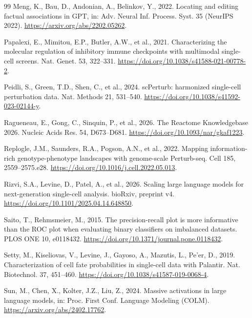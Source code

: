 \documentclass[review,authoryear,12pt]{elsarticle}
\begin{document}
\begin{thebibliography}{99}
 Meng, K., Bau, D., Andonian, A., Belinkov, Y., 2022. Locating and editing factual associations in GPT, in: Adv. Neural Inf. Process. Syst. 35 (NeurIPS 2022). \url{https://arxiv.org/abs/2202.05262}.

 Papalexi, E., Mimitou, E.P., Butler, A.W., et al., 2021. Characterizing the molecular regulation of inhibitory immune checkpoints with multimodal single-cell screens. Nat. Genet. 53, 322--331. \url{https://doi.org/10.1038/s41588-021-00778-2}.

 Peidli, S., Green, T.D., Shen, C., et al., 2024. scPerturb: harmonized single-cell perturbation data. Nat. Methods 21, 531--540. \url{https://doi.org/10.1038/s41592-023-02144-y}.

 Ragueneau, E., Gong, C., Sinquin, P., et al., 2026. The Reactome Knowledgebase 2026. Nucleic Acids Res. 54, D673--D681. \url{https://doi.org/10.1093/nar/gkaf1223}.

 Replogle, J.M., Saunders, R.A., Pogson, A.N., et al., 2022. Mapping information-rich genotype-phenotype landscapes with genome-scale Perturb-seq. Cell 185, 2559--2575.e28. \url{https://doi.org/10.1016/j.cell.2022.05.013}.

 Rizvi, S.A., Levine, D., Patel, A., et al., 2026. Scaling large language models for next-generation single-cell analysis. bioRxiv, preprint v4. \url{https://doi.org/10.1101/2025.04.14.648850}.

 Saito, T., Rehmsmeier, M., 2015. The precision-recall plot is more informative than the ROC plot when evaluating binary classifiers on imbalanced datasets. PLOS ONE 10, e0118432. \url{https://doi.org/10.1371/journal.pone.0118432}.

 Setty, M., Kiseliovas, V., Levine, J., Gayoso, A., Mazutis, L., Pe'er, D., 2019. Characterization of cell fate probabilities in single-cell data with Palantir. Nat. Biotechnol. 37, 451--460. \url{https://doi.org/10.1038/s41587-019-0068-4}.

 Sun, M., Chen, X., Kolter, J.Z., Liu, Z., 2024. Massive activations in large language models, in: Proc. First Conf. Language Modeling (COLM). \url{https://arxiv.org/abs/2402.17762}.


\end{thebibliography}
\end{document}
